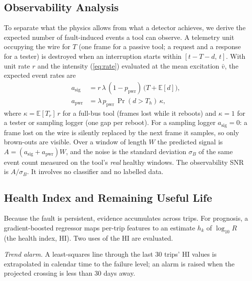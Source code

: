 \subsection{Observability Analysis}
\label{sec:method_obs}
To separate what the physics allows from what a detector achieves, we
derive the expected number of fault-induced events a tool can observe. A
telemetry unit occupying the wire for $T$ (one frame for a passive tool;
a request and a response for a tester) is destroyed when an interruption
starts within $[t-T-d,\,t]$. With unit rate $r$ and the intensity
(\ref{eq:rate}) evaluated at the mean excitation $\bar v$, the expected
event rates are
\begin{align}
a_{\mathrm{sig}} &= r\,\lambda\,(1-p_{\mathrm{pwr}})\,\big(T+\mathbb E[d]\big),
\label{eq:asig}\\
a_{\mathrm{pwr}} &= \lambda\,p_{\mathrm{pwr}}\,\Pr(d>T_h)\,\kappa,
\label{eq:apwr}
\end{align}
where $\kappa=\mathbb E[T_r]\,r$ for a full-bus tool (frames lost while
it reboots) and $\kappa=1$ for a tester or sampling logger (one gap per
reboot). For a sampling logger $a_{\mathrm{sig}}=0$: a frame lost on the wire is
silently replaced by the next frame it samples, so only brown-outs are
visible. Over a window of length $W$ the predicted signal is
$A=(a_{\mathrm{sig}}+a_{\mathrm{pwr}})W$, and the noise is the standard
deviation $\sigma_B$ of the same event count measured on the tool's
\emph{real} healthy windows. The observability SNR is $A/\sigma_B$. It
involves no classifier and no labelled data.

\subsection{Health Index and Remaining Useful Life}
Because the fault is persistent, evidence accumulates across trips. For
prognosis, a gradient-boosted regressor maps per-trip features to an
estimate $h_k$ of $\log_{10}R$ (the health index, HI). Two uses of the HI
are evaluated.

\emph{Trend alarm.} A least-squares line through the last 30 trips' HI
values is extrapolated in calendar time to the failure level; an alarm is
raised when the projected crossing is less than 30 days away.

